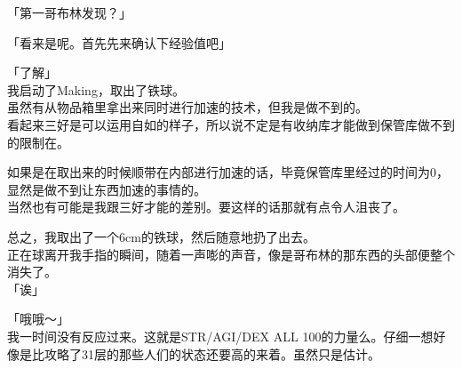 「第一哥布林发现？」

「看来是呢。首先先来确认下经验值吧」

「了解」\\

我启动了Making，取出了铁球。\\

虽然有从物品箱里拿出来同时进行加速的技术，但我是做不到的。\\

看起来三好是可以运用自如的样子，所以说不定是有收纳库才能做到保管库做不到的限制在。

如果是在取出来的时候顺带在内部进行加速的话，毕竟保管库里经过的时间为0，显然是做不到让东西加速的事情的。\\

当然也有可能是我跟三好才能的差别。要这样的话那就有点令人沮丧了。

总之，我取出了一个6cm的铁球，然后随意地扔了出去。\\

正在球离开我手指的瞬间，随着一声嘭的声音，像是哥布林的那东西的头部便整个消失了。\\

「诶」

「哦哦～」\\

我一时间没有反应过来。这就是STR/AGI/DEX ALL 100的力量么。仔细一想好像是比攻略了31层的那些人们的状态还要高的来着。虽然只是估计。\\


